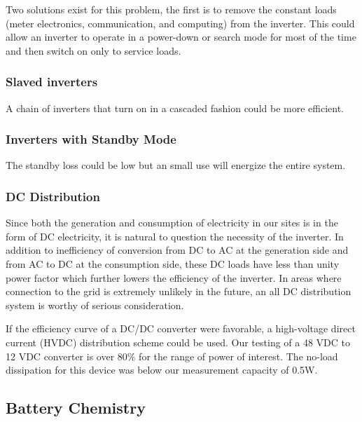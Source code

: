 \documentclass[conference]{IEEEtran}
\begin{document}
Two solutions exist for this problem, the first is to remove
the constant loads (meter electronics, communication, and
computing) from the inverter.
This could allow an inverter to operate in a power-down or
search mode for most of the time and then switch on only
to service loads.

\subsubsection{Slaved inverters}
A chain of inverters that turn on in a cascaded fashion could
be more efficient.

\subsubsection{Inverters with Standby Mode}
The standby loss could be low but an small use will energize the
entire system.

\subsubsection{DC Distribution}

Since both the generation and consumption of electricity in our
sites is in the form of DC electricity, it is natural to
question the necessity of the inverter.
In addition to inefficiency of conversion from DC to AC at the
generation side and from AC to DC at the consumption side,
these DC loads have less than unity power factor which further
lowers the efficiency of the inverter.
In areas where connection to the grid is extremely unlikely
in the future, an all DC distribution system is worthy of
serious consideration.

If the efficiency curve of a DC/DC converter were favorable,
a high-voltage direct current (HVDC) distribution scheme could
be used.
Our testing of a 48 VDC to 12 VDC converter is over 80\% for
the range of power of interest.
The no-load dissipation for this device was below our measurement
capacity of 0.5W.


\subsection{Battery Chemistry}



% 
\end{document}
